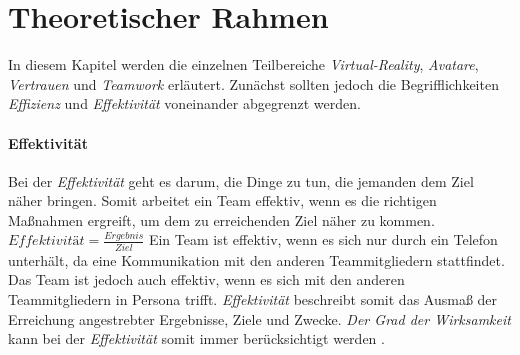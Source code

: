 \documentclass[a4paper,11pt]{article}%
\renewcommand{\\}{\vspace*{0.5\baselineskip} \newline}
\begin{document}
%
%
%
%

	\newpage
\section{Theoretischer Rahmen}

In diesem Kapitel werden die einzelnen Teilbereiche \textit{Virtual-Reality}, \textit{Avatare}, \textit{Vertrauen} und \textit{Teamwork} erläutert.
Zunächst sollten jedoch die Begrifflichkeiten \textit{Effizienz} und \textit{Effektivität} voneinander abgegrenzt werden.
%

\paragraph{Effektivität}
Bei der \textit{Effektivität} geht es darum, die Dinge zu tun, die jemanden dem Ziel näher bringen. 
Somit arbeitet ein Team effektiv, wenn es die richtigen Maßnahmen ergreift, um dem zu erreichenden Ziel näher zu kommen.\\
$Effektivität = \frac{Ergebnis}{Ziel}$ \\
Ein Team ist effektiv, wenn es sich nur durch ein Telefon unterhält, da eine Kommunikation mit den anderen Teammitgliedern stattfindet. Das Team ist jedoch auch effektiv, wenn es sich mit den anderen Teammitgliedern in Persona trifft.
\textit{Effektivität} beschreibt somit das Ausmaß der Erreichung angestrebter Ergebnisse, Ziele und Zwecke.
\textit{Der Grad der Wirksamkeit} kann bei der \textit{Effektivität} somit immer berücksichtigt werden \citep{eichhorn2005prinzip}.
\end{document}
